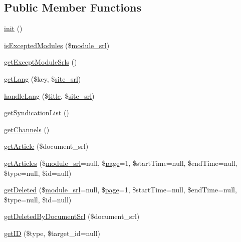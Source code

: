 \subsection*{Public Member Functions}
\begin{DoxyCompactItemize}
\item 
\hyperlink{classsyndicationModel_a38c614c75ca785bb6171b7ef23e56c31}{init} ()
\item 
\hyperlink{classsyndicationModel_a6a958b091c14b69100ba0552c2a672b9}{is\-Excepted\-Modules} (\$\hyperlink{ko_8install_8php_a370bb6450fab1da3e0ed9f484a38b761}{module\-\_\-srl})
\item 
\hyperlink{classsyndicationModel_a30704bc9b85ae1b71c0b9f05ffb343ee}{get\-Except\-Module\-Srls} ()
\item 
\hyperlink{classsyndicationModel_a71eb9105a8294b2ac8a456ba33cbf3bc}{get\-Lang} (\$key, \$\hyperlink{ko_8install_8php_a8b1406b4ad1048041558dce6bfe89004}{site\-\_\-srl})
\item 
\hyperlink{classsyndicationModel_a3020582efc1d3d049bbd8fc983ce73e5}{handle\-Lang} (\$\hyperlink{ko_8install_8php_a5b072c5fd1d2228c6ba5cee13cd142e3}{title}, \$\hyperlink{ko_8install_8php_a8b1406b4ad1048041558dce6bfe89004}{site\-\_\-srl})
\item 
\hyperlink{classsyndicationModel_a59f74298a63c75006d1ed8472316e267}{get\-Syndication\-List} ()
\item 
\hyperlink{classsyndicationModel_a9227f311a03b74ed886c52948798cf50}{get\-Channels} ()
\item 
\hyperlink{classsyndicationModel_a312600372c1ed5b26905f3c54ec893be}{get\-Article} (\$document\-\_\-srl)
\item 
\hyperlink{classsyndicationModel_a887717eccda26881c4b3e98b31808b7f}{get\-Articles} (\$\hyperlink{ko_8install_8php_a370bb6450fab1da3e0ed9f484a38b761}{module\-\_\-srl}=null, \$\hyperlink{classpage}{page}=1, \$start\-Time=null, \$end\-Time=null, \$type=null, \$id=null)
\item 
\hyperlink{classsyndicationModel_a3988bb26d95b4b5c2a9c14284302f853}{get\-Deleted} (\$\hyperlink{ko_8install_8php_a370bb6450fab1da3e0ed9f484a38b761}{module\-\_\-srl}=null, \$\hyperlink{classpage}{page}=1, \$start\-Time=null, \$end\-Time=null, \$type=null, \$id=null)
\item 
\hyperlink{classsyndicationModel_a0b22d223af57a7a94a9fc7d4e258264b}{get\-Deleted\-By\-Document\-Srl} (\$document\-\_\-srl)
\item 
\hyperlink{classsyndicationModel_a01eec5ce14c916eb50588ba7ad00567d}{get\-I\-D} (\$type, \$target\-\_\-id=null)

\end{DoxyCompactItemize}
